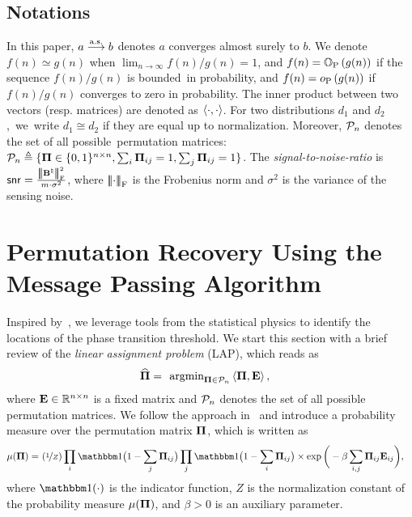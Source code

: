 \documentclass[11pt]{article}
\begin{document}
\subsection{Notations}
In this paper, $a\stackrel{\textup{a.s.}}{\longrightarrow} b$ denotes
$a$ converges almost surely to $b$.
We denote $f(n)\simeq g(n)$ when
$\lim_{n\rightarrow \infty}{f(n)}/{g(n)} = 1$, and  $f(n) = \mathbb{O}_{\textup{P}}\left(g(n)\right)$
if the sequence ${f(n)}/{g(n)}$
is bounded~in probability,
and  $f(n)=o_{\textup{P}}\left(g(n)\right)$
if  ${f(n)}/{g(n)}$
converges to zero in probability.
The inner product between two vectors (resp. matrices) are denoted
as $\left \langle \cdot, \cdot \right \rangle$.  For two distributions $d_1$ and $d_2$,~we~write
$d_1 \cong d_2$ if they are equal up to  normalization.
Moreover,  ${\cal P}_n$ denotes the set of
all possible~permutation matrices:
${\cal P}_n \triangleq \{\boldsymbol{\Pi} \in \{0, 1\}^{n\times n}, \sum_i \boldsymbol{\Pi}_{ij} = 1, \sum_j \boldsymbol{\Pi}_{ij} = 1\}$.
The \emph{signal-to-noise-ratio} is
$\mathsf{snr} = \frac{{\left\vert\kern-0.4ex\left\vert\kern-0.4ex\left\vert \mathbf{B}^{\natural} \right\vert\kern-0.4ex\right\vert\kern-0.4ex\right\vert}_{\textup{F}}^2}{m\cdot \sigma^2}$, where
${\left\vert\kern-0.4ex\left\vert\kern-0.4ex\left\vert \cdot \right\vert\kern-0.4ex\right\vert\kern-0.4ex\right\vert}_{\textup{F}}$ is the Frobenius norm and
$\sigma^2$ is the variance of the sensing noise.


\section{Permutation Recovery Using the Message Passing Algorithm}

Inspired by~\citet{mezard2009information, chertkov2010inference, semerjian2020recovery}, we leverage  tools from the statistical
physics to identify the locations of the phase transition threshold. We start this section with a brief review of
the \emph{linear assignment problem}
(LAP), which reads as
\begin{align}
\label{eq:lap_def}
\wh{\bPi} =~& \
\argmin_{\bPi \in \calP_n} \la \bPi, \bE \ra,
\vspace{-5mm}
\end{align}
where $\mathbf{E}\in \mathbb{R}^{n\times n}$ is a fixed matrix
and ${\cal P}_n$ denotes the set of all possible permutation matrices.
We follow the approach in~\citet{mezard2009information,semerjian2020recovery} and introduce a
probability measure over the permutation matrix $\boldsymbol{\Pi}$,
which is written as
\begin{align}
\label{eq:prob_measure}
\mu(\bPi)  =~& (\nfrac{1}{Z})\prod_{i} \Ind\big(1 - \sum_j \bPi_{ij}\big)
\prod_j \Ind\big(1 - \sum_i \bPi_{ij}\big) \times \exp\bigg(-\beta \sum_{i,j}\bPi_{ij} \bE_{ij}\bigg),
\end{align}
where $\Ind(\cdot)$ is the indicator function,
$Z$ is the normalization constant of the probability measure
$\mu(\boldsymbol{\Pi})$, and $\beta > 0$ is an auxiliary parameter.
\end{document}
